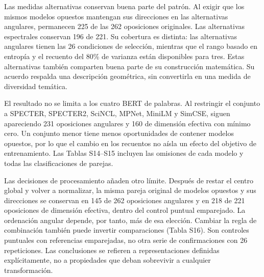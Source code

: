 \documentclass[12pt]{article}
\begin{document}

Las medidas alternativas conservan buena parte del patrón. Al exigir que los mismos modelos opuestos mantengan sus direcciones en las alternativas angulares, permanecen 225 de las 262 oposiciones originales. Las alternativas espectrales conservan 196 de 221. Su cobertura es distinta: las alternativas angulares tienen las 26 condiciones de selección, mientras que el rango basado en entropía y el recuento del 80\% de varianza están disponibles para tres. Estas alternativas también comparten buena parte de su construcción matemática. Su acuerdo respalda una descripción geométrica, sin convertirla en una medida de diversidad temática.

El resultado no se limita a los cuatro BERT de palabras. Al restringir el conjunto a SPECTER, SPECTER2, SciNCL, MPNet, MiniLM y SimCSE, siguen apareciendo 231 oposiciones angulares y 160 de dimensión efectiva con mínimo cero. Un conjunto menor tiene menos oportunidades de contener modelos opuestos, por lo que el cambio en los recuentos no aísla un efecto del objetivo de entrenamiento. Las Tablas S14--S15 incluyen las omisiones de cada modelo y todas las clasificaciones de parejas.

Las decisiones de procesamiento añaden otro límite. Después de restar el centro global y volver a normalizar, la misma pareja original de modelos opuestos y sus direcciones se conservan en 145 de 262 oposiciones angulares y en 218 de 221 oposiciones de dimensión efectiva, dentro del control puntual emparejado. La ordenación angular depende, por tanto, más de esa elección. Cambiar la regla de combinación también puede invertir comparaciones (Tabla S16). Son controles puntuales con referencias emparejadas, no otra serie de confirmaciones con 26 repeticiones. Las conclusiones se refieren a representaciones definidas explícitamente, no a propiedades que deban sobrevivir a cualquier transformación.
\end{document}
